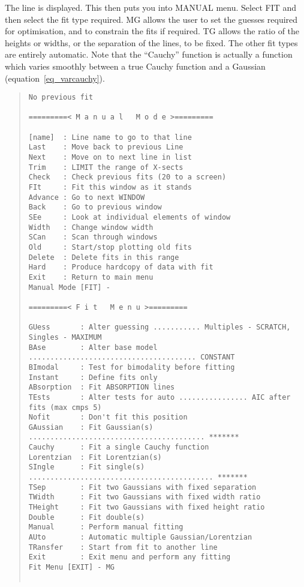 The line is displayed.  This then puts you into MANUAL menu. Select FIT
and then select the fit type required.  MG allows the user to set the
guesses required for optimisation, and to constrain the fits if
required. TG allows the ratio of the heights or widths, or the
separation of the lines, to be fixed. The other fit types are entirely
automatic. Note that the ``Cauchy'' function is actually a function
which varies smoothly between a true Cauchy function and a Gaussian
(equation~\ref{eq_varcauchy}).

\begin{quote}\begin{small}\begin{verbatim}
No previous fit
 
=========< M a n u a l   M o d e >=========
 
[name]  : Line name to go to that line
Last    : Move back to previous Line
Next    : Move on to next line in list
Trim    : LIMIT the range of X-sects
Check   : Check previous fits (20 to a screen)
FIt     : Fit this window as it stands
Advance : Go to next WINDOW
Back    : Go to previous window
SEe     : Look at individual elements of window
Width   : Change window width
SCan    : Scan through windows
Old     : Start/stop plotting old fits
Delete  : Delete fits in this range
Hard    : Produce hardcopy of data with fit
Exit    : Return to main menu
Manual Mode [FIT] -
 
=========< F i t   M e n u >=========
 
GUess       : Alter guessing ........... Multiples - SCRATCH, Singles - MAXIMUM
BAse        : Alter base model ....................................... CONSTANT
BImodal     : Test for bimodality before fitting
Instant     : Define fits only
ABsorption  : Fit ABSORPTION lines
TEsts       : Alter tests for auto ................ AIC after fits (max cmps 5)
Nofit       : Don't fit this position
GAussian    : Fit Gaussian(s) ......................................... *******
Cauchy      : Fit a single Cauchy function
Lorentzian  : Fit Lorentzian(s)
SIngle      : Fit single(s) ........................................... *******
TSep        : Fit two Gaussians with fixed separation
TWidth      : Fit two Gaussians with fixed width ratio
THeight     : Fit two Gaussians with fixed height ratio
Double      : Fit double(s)
Manual      : Perform manual fitting
AUto        : Automatic multiple Gaussian/Lorentzian
TRansfer    : Start from fit to another line
Exit        : Exit menu and perform any fitting
Fit Menu [EXIT] - MG
 

\end{verbatim}
\end{small}
\end{quote}
